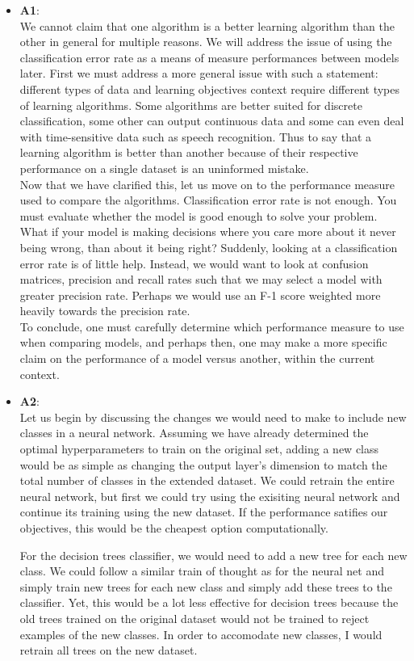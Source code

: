 \begin{itemize}


\item \textbf{A1}:\\
  We cannot claim that one algorithm is a better learning algorithm than the other in general for multiple reasons.
  We will address the issue of using the classification error rate as a means of measure performances between models later.
  First we must address a more general issue with such a statement:
  different types of data and learning objectives context require different types of learning algorithms.
  Some algorithms are better suited for discrete classification, some other can output continuous data and some can even deal with 
  time-sensitive data such as speech recognition.
  Thus to say that a learning algorithm is better than another because of their respective performance on a single dataset is an uninformed mistake.\\
  Now that we have clarified this, let us move on to the performance measure used to compare the algorithms.
  Classification error rate is not enough.
  You must evaluate whether the model is good enough to solve your problem.
  What if your model is making decisions where you care more about it never being wrong, than about it being right?
  Suddenly, looking at a classification error rate is of little help.
  Instead, we would want to look at confusion matrices, precision and recall rates such that we may select a model with greater
  precision rate.
  Perhaps we would use an F-1 score weighted more heavily towards the precision rate.\\
  To conclude, one must carefully determine which performance measure to use when comparing models, and perhaps then, one may make
  a more specific claim on the performance of a model versus another, within the current context.
  
\item \textbf{A2}:\\
  Let us begin by discussing the changes we would need to make to include new classes in a neural network.
  Assuming we have already determined the optimal hyperparameters to train on the original set,
  adding a new class would be as simple as changing
  the output layer's dimension to match the total number of classes in the extended dataset.
  We could retrain the entire neural network, but first we could try using the exisiting neural network and continue its training
  using the new dataset.
  If the performance satifies our objectives, this would be the cheapest option computationally.

  For the decision trees classifier, we would need to add a new tree for each new class.
  We could follow a similar train of thought as for the neural net and simply train new trees for each new class
  and simply add these trees to the classifier.
  Yet, this would be a lot less effective for decision trees because the old trees trained on the original dataset would not be trained
  to reject examples of the new classes.
  In order to accomodate new classes, I would retrain all trees on the new dataset.
  
\end{itemize}
